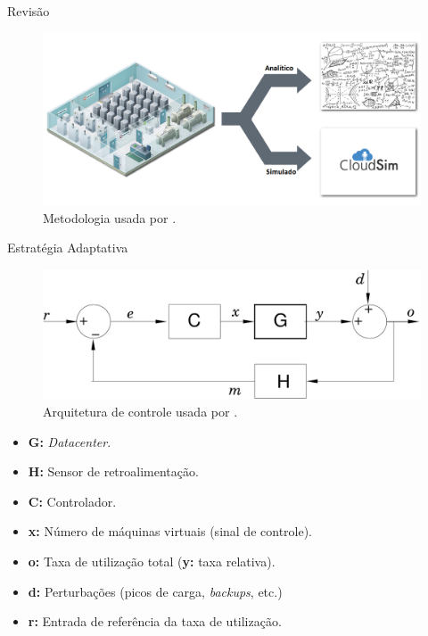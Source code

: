 \begin{frame}{Revisão}
	
	\begin{figure}[!htb]
		\centering 
		\includegraphics[scale=0.33]{images/abstracao-nobile2.png}
		\caption{Metodologia usada por \cite{Nobile2013}.}
		\label{fig-market-oriented-broker}
	\end{figure}
	
\end{frame}

\begin{frame}{Estratégia Adaptativa}
	
	\begin{figure}
		\center
		\includegraphics[scale=0.3]{images/feedback-loop-3.pdf}
		\caption{Arquitetura de controle usada por \cite{Nobile2013}.}
		\label{fig:loop-nobile}
	\end{figure}
	
	\begin{itemize}
		\item \textbf{G:} \textit{Datacenter}.
		\item \textbf{H:} Sensor de retroalimentação.
		\item \textbf{C:} Controlador.
		\item \textbf{x:} Número de máquinas virtuais (sinal de controle).
		\item \textbf{o:} Taxa de utilização total (\textbf{y:} taxa relativa).
		\item \textbf{d:} Perturbações (picos de carga, \textit{backups}, etc.) 
		\item \textbf{r:} Entrada de referência da taxa de utilização.
	\end{itemize}
\end{frame}

